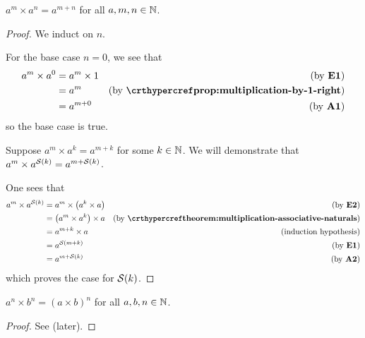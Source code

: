 \begin{theorem}\label{theorem:exponents-product-with-same-base}
    $a^m \times a^n = a^{m+n}$ for all $a, m, n \in \mathbb{N}$.
\end{theorem}
\begin{proof}
    We induct on $n$.

    For the base case $n = 0$, we see that
    \begin{align*}
        a^m \times a^0 &= a^m \times 1 & (\text{by \textbf{E1}})\\
        &= a^m & (\text{by \myref{prop:multiplication-by-1-right}})\\
        &= a^{m+0} & (\text{by \textbf{A1}})
    \end{align*}
    so the base case is true.

    Suppose $a^m \times a^k = a^{m+k}$ for some $k \in \mathbb{N}$. We will demonstrate that $a^m \times a^{\mathcal{S}(k)} = a^{m+{\mathcal{S}(k)}}$.

    One sees that
    \begin{align*}
        a^m \times a^\Successor{k} &= a^m \times \left(a^k \times a\right) & (\text{by \textbf{E2}})\\
        &= \left(a^m \times a^k\right) \times a & (\text{by \myref{theorem:multiplication-associative-naturals}})\\
        &= a^{m+k} \times a & (\text{induction hypothesis})\\
        &= a^{\Successor{m+k}} & (\text{by \textbf{E1}})\\
        &= a^{m+\Successor{k}} & (\text{by \textbf{A2}})
    \end{align*}
    which proves the case for ${\mathcal{S}(k)}$.
\end{proof}

\begin{theorem}\label{theorem:exponents-product-to-a-power}
    $a^n \times b^n = (a\times b)^n$ for all $a, b, n \in \mathbb{N}$.
\end{theorem}
\begin{proof}
    See  (later).
\end{proof}

